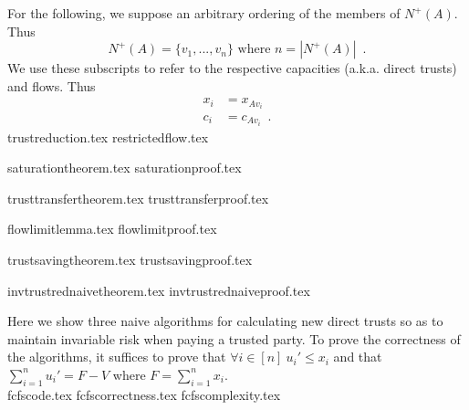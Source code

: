 \documentclass[11pt]{llncs}
\begin{document}
  For the following, we suppose an arbitrary ordering of the members of $N^{+}\left(A\right)$. Thus
  \begin{equation*}
     N^{+}\left(A\right) = \{v_1, ..., v_n\} \mbox{ where } n = |N^{+}\left(A\right)| \enspace.
  \end{equation*}
  We use these subscripts to refer to the respective capacities (a.k.a. direct trusts) and flows. Thus
  \begin{align*}
     x_i &= x_{Av_i} \\
     c_i &= c_{Av_i} \enspace.
  \end{align*}
  {trustreduction.tex}
  {restrictedflow.tex}

  {saturationtheorem.tex}
  {saturationproof.tex}

  {trusttransfertheorem.tex}
  {trusttransferproof.tex}

  {flowlimitlemma.tex}
  {flowlimitproof.tex}

  {trustsavingtheorem.tex}
  {trustsavingproof.tex}

  {invtrustrednaivetheorem.tex}
  {invtrustrednaiveproof.tex}


  Here we show three naive algorithms for calculating new direct trusts so as to maintain invariable risk when paying
  a trusted party. To prove the correctness of the algorithms, it suffices to prove that $\forall i \in [n] \:
  u_i' \leq x_i$ and that $\sum\limits_{i=1}^{n}u_i' = F - V$ where $F = \sum\limits_{i=1}^{n}x_i$. \\
  {fcfscode.tex}
  {fcfscorrectness.tex}
  {fcfscomplexity.tex}
\end{document}
